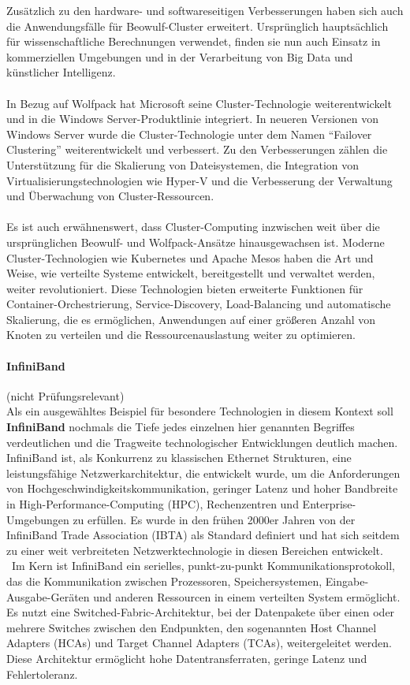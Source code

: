 \documentclass[../vs-script-first-v01.tex]{subfiles}
\begin{document}
Zusätzlich zu den hardware- und softwareseitigen Verbesserungen haben sich auch die Anwendungsfälle für Beowulf-Cluster erweitert. Ursprünglich hauptsächlich für wissenschaftliche Berechnungen verwendet, finden sie nun auch Einsatz in kommerziellen Umgebungen und in der Verarbeitung von Big Data und künstlicher Intelligenz.
\\\\
In Bezug auf Wolfpack hat Microsoft seine Cluster-Technologie weiterentwickelt und in die Windows Server-Produktlinie integriert. In neueren Versionen von Windows Server wurde die Cluster-Technologie unter dem Namen \enquote{Failover Clustering} weiterentwickelt und verbessert. Zu den Verbesserungen zählen die Unterstützung für die Skalierung von Dateisystemen, die Integration von Virtualisierungstechnologien wie Hyper-V und die Verbesserung der Verwaltung und Überwachung von Cluster-Ressourcen.
\\\\
Es ist auch erwähnenswert, dass Cluster-Computing inzwischen weit über die ursprünglichen Beowulf- und Wolfpack-Ansätze hinausgewachsen ist. Moderne Cluster-Technologien wie Kubernetes und Apache Mesos haben die Art und Weise, wie verteilte Systeme entwickelt, bereitgestellt und verwaltet werden, weiter revolutioniert. Diese Technologien bieten erweiterte Funktionen für Container-Orchestrierung, Service-Discovery, Load-Balancing und automatische Skalierung, die es ermöglichen, Anwendungen auf einer größeren Anzahl von Knoten zu verteilen und die Ressourcenauslastung weiter zu optimieren.
\paragraph{InfiniBand}(nicht Prüfungsrelevant)\mbox{}\\
Als ein ausgewähltes Beispiel für besondere Technologien in diesem Kontext soll \textbf{InfiniBand} nochmals die Tiefe jedes einzelnen hier genannten Begriffes verdeutlichen und die Tragweite technologischer Entwicklungen deutlich machen. InfiniBand ist, als Konkurrenz zu klassischen Ethernet Strukturen, eine leistungsfähige Netzwerkarchitektur, die entwickelt wurde, um die Anforderungen von Hochgeschwindigkeitskommunikation, geringer Latenz und hoher Bandbreite in High-Performance-Computing (HPC), Rechenzentren und Enterprise-Umgebungen zu erfüllen. Es wurde in den frühen 2000er Jahren von der InfiniBand Trade Association (IBTA) als Standard definiert und hat sich seitdem zu einer weit verbreiteten Netzwerktechnologie in diesen Bereichen entwickelt.
\\\
Im Kern ist InfiniBand ein serielles, punkt-zu-punkt Kommunikationsprotokoll, das die Kommunikation zwischen Prozessoren, Speichersystemen, Eingabe-Ausgabe-Geräten und anderen Ressourcen in einem verteilten System ermöglicht. Es nutzt eine Switched-Fabric-Architektur, bei der Datenpakete über einen oder mehrere Switches zwischen den Endpunkten, den sogenannten Host Channel Adapters (HCAs) und Target Channel Adapters (TCAs), weitergeleitet werden. Diese Architektur ermöglicht hohe Datentransferraten, geringe Latenz und Fehlertoleranz.
\end{document}
